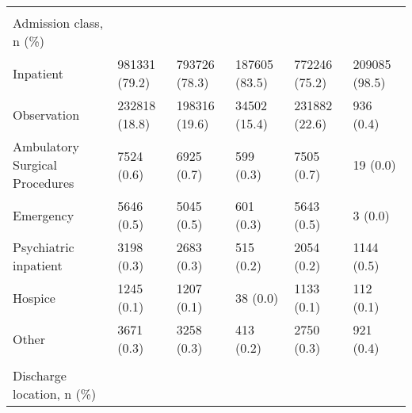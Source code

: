\begin{adjustbox}{width={\textwidth},totalheight={\textheight},keepaspectratio,frame}
{\begin{tabular}{L{20em}C{10em}C{10em}C{10em}C{10em}C{10em}}
&                 &                            &                        &                             &                        \\
Admission class, n (\%) &                 &                            &                        &                             &                        \\
\hspace{3mm}                                Inpatient &      981331 (79.2) &                 793726 (78.3) &             187605 (83.5) &                  772246 (75.2) &             209085 (98.5) \\
\hspace{3mm}                              Observation &      232818 (18.8) &                 198316 (19.6) &              34502 (15.4) &                  231882 (22.6) &                 936 (0.4) \\
\hspace{3mm}           Ambulatory Surgical Procedures &         7524 (0.6) &                    6925 (0.7) &                 599 (0.3) &                     7505 (0.7) &                  19 (0.0) \\
\hspace{3mm}                                Emergency &         5646 (0.5) &                    5045 (0.5) &                 601 (0.3) &                     5643 (0.5) &                   3 (0.0) \\
\hspace{3mm}                    Psychiatric inpatient &         3198 (0.3) &                    2683 (0.3) &                 515 (0.2) &                     2054 (0.2) &                1144 (0.5) \\
\hspace{3mm}                                   Hospice &         1245 (0.1) &                    1207 (0.1) &                  38 (0.0) &                     1133 (0.1) &                 112 (0.1) \\
\hspace{3mm}                                    Other &         3671 (0.3) &                    3258 (0.3) &                 413 (0.2) &                     2750 (0.3) &                 921 (0.4) \\
&                 &                            &                        &                             &                        \\
Discharge location, n (\%) &                 &                            &                        &                             &                        \\

\end{tabular}}
\end{adjustbox}
